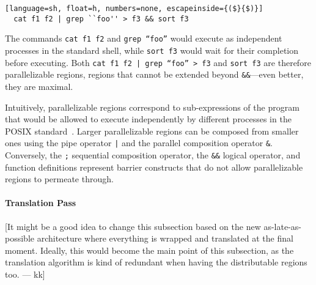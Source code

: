 \documentclass[letterpaper,twocolumn,10pt]{article}
\newcommand{\ttt}[1]{\texttt{\small #1}}
\newcommand{\kk}[1]{[{\color{magenta}#1 --- kk}]}
\newcommand{\tr}[1]{} %
\begin{document}
\begin{lstlisting}[language=sh, float=h, numbers=none, escapeinside={($}{$)}]
  cat f1 f2 | grep ``foo'' > f3 && sort f3 
\end{lstlisting}

\noindent
The commands \ttt{cat f1 f2} and \ttt{grep ``foo''} would execute as
independent processes in the standard shell, while \ttt{sort f3} would
wait for their completion before executing.  Both \ttt{cat f1 f2 |
  grep ``foo'' > f3} and \ttt{sort f3} are therefore parallelizable
regions, regions that cannot be extended beyond \ttt{\&\&}---even
better, they are maximal.

Intuitively, parallelizable regions correspond to sub-expressions of
the program that would be allowed to execute independently by
different processes in the POSIX standard~\cite{posix}. Larger
parallelizable regions can be composed from smaller ones using the
pipe operator \ttt{|} and the parallel composition operator \ttt{\&}.
Conversely, the \ttt{;} sequential composition operator, the
\ttt{\&\&} logical operator, and function definitions represent
barrier constructs that do not allow parallelizable regions to
permeate through.

% 
% 
% 

\paragraph{Translation Pass}

\kk{It might be a good idea to change this subsection based on the new
  as-late-as-possible architecture where everything is wrapped and
  translated at the final moment. Ideally, this would become the main
  point of this subsection, as the translation algorithm is kind of
  redundant when having the distributable regions too.}
\end{document}
